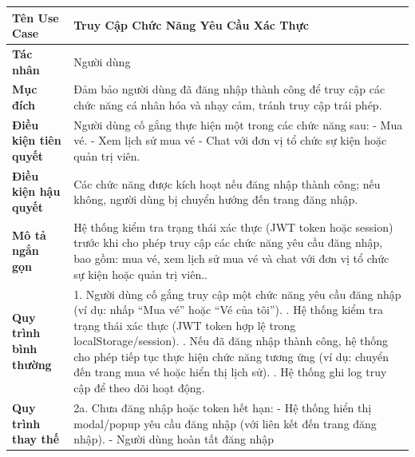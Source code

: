 \begin{table}[H]
\centering
\renewcommand{\arraystretch}{1.3}
\setlength{\tabcolsep}{8pt}
\begin{tabularx}{\textwidth}{|l|X|}
\hline
\textbf{Tên Use Case} & Truy Cập Chức Năng Yêu Cầu Xác Thực \\ \hline
\textbf{Tác nhân} & Người dùng \\ \hline
\textbf{Mục đích} & Đảm bảo người dùng đã đăng nhập thành công để truy cập các chức năng cá nhân hóa và nhạy cảm, tránh truy cập trái phép. \\ \hline
\textbf{Điều kiện tiên quyết} &
Người dùng cố gắng thực hiện một trong các chức năng sau: \newline
\hspace*{1em}- Mua vé. \newline
\hspace*{1em}- Xem lịch sử mua vé \newline
\hspace*{1em}- Chat với đơn vị tổ chức sự kiện hoặc quản trị viên. \\ \hline
\textbf{Điều kiện hậu quyết} & Các chức năng được kích hoạt nếu đăng nhập thành công; nếu không, người dùng bị chuyển hướng đến trang đăng nhập. \\ \hline
\textbf{Mô tả ngắn gọn} & Hệ thống kiểm tra trạng thái xác thực (JWT token hoặc session) trước khi cho phép truy cập các chức năng yêu cầu đăng nhập, bao gồm: mua vé, xem lịch sử mua vé và chat với đơn vị tổ chức sự kiện hoặc quản trị viên..\\ \hline
\textbf{Quy trình bình thường} &
1. Người dùng cố gắng truy cập một chức năng yêu cầu đăng nhập (ví dụ: nhấp “Mua vé” hoặc “Vé của tôi”). \newline
2. Hệ thống kiểm tra trạng thái xác thực (JWT token hợp lệ trong localStorage/session). \newline
3. Nếu đã đăng nhập thành công, hệ thống cho phép tiếp tục thực hiện chức năng tương ứng (ví dụ: chuyển đến trang mua vé hoặc hiển thị lịch sử). \newline
4. Hệ thống ghi log truy cập để theo dõi hoạt động. \\ \hline
\textbf{Quy trình thay thế} &
2a. Chưa đăng nhập hoặc token hết hạn: \newline
\hspace*{1em}- Hệ thống hiển thị modal/popup yêu cầu đăng nhập (với liên kết đến trang đăng nhập). \newline
\hspace*{1em}- Người dùng hoàn tất đăng nhập \newline

\end{tabularx}
\end{table}
